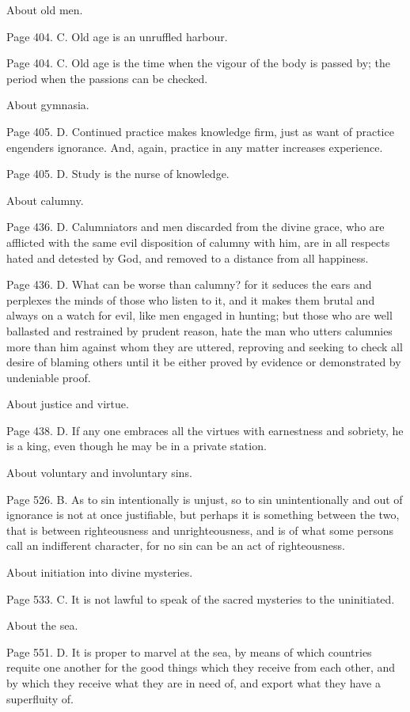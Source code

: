 About old men.

Page 404. C. Old age is an unruffled harbour.

Page 404. C. Old age is the time when the vigour of the body is passed by; the period when the
passions can be checked.

About gymnasia.

Page 405. D. Continued practice makes knowledge firm, just as want of practice engenders
ignorance. And, again, practice in any matter increases experience.

Page 405. D. Study is the nurse of knowledge.

About calumny.

Page 436. D. Calumniators and men discarded from the divine grace, who are afflicted with the
same evil disposition of calumny with him, are in all respects hated and detested by God, and
removed to a distance from all happiness.

Page 436. D. What can be worse than calumny? for it seduces the ears and perplexes the minds
of those who listen to it, and it makes them brutal and always on a watch for evil, like men engaged
in hunting; but those who are well ballasted and restrained by prudent reason, hate the man who
utters calumnies more than him against whom they are uttered, reproving and seeking to check all
desire of blaming others until it be either proved by evidence or demonstrated by undeniable proof.

About justice and virtue.

Page 438. D. If any one embraces all the virtues with earnestness and sobriety, he is a king, even
though he may be in a private station.

About voluntary and involuntary sins.

Page 526. B. As to sin intentionally is unjust, so to sin unintentionally and out of ignorance is not at
once justifiable, but perhaps it is something between the two, that is between righteousness and
unrighteousness, and is of what some persons call an indifferent character, for no sin can be an
act of righteousness.

About initiation into divine mysteries.

Page 533. C. It is not lawful to speak of the sacred mysteries to the uninitiated.

About the sea.

Page 551. D. It is proper to marvel at the sea, by means of which countries requite one another for
the good things which they receive from each other, and by which they receive what they are in
need of, and export what they have a superfluity of.

